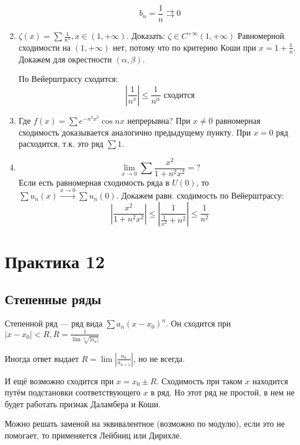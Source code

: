 \begin{exercise}
\begin{enumerate}
              \[b_n = \frac{1}{n} \rightrightarrows 0\]
        \item \(\zeta(x) = \sum \frac{1}{n^x}, x\in(1, +\infty)\). Доказать: \(\zeta \in C^{+\infty} (1, +\infty)\)
              Равномерной сходимости на \((1, +\infty)\) нет, потому что по критерию Коши при \(x = 1 + \frac{1}{n}\). Докажем для окрестности \((\alpha, \beta)\).

              По Вейерштрассу сходится:
              \[\left|\frac{1}{n^x}\right| \leq \frac{1}{n^\alpha} \text{ сходится}\]
        \item Где \(f(x) = \sum e^{ - n^2x^2} \cos nx\) непрерывна?
              При \(x \neq 0\) равномерная сходимость доказывается аналогично предыдущему пункту. При \(x = 0\) ряд расходится, т.к. это ряд \(\sum 1\).
        \item \[\lim_{x \to 0} \sum \frac{x^2}{1 + n^2x^2} = ?\]
              Если есть равномерная сходимость ряда в \(U(0)\), то \(\sum u_n(x) \xrightarrow{x\to 0} \sum u_n(0)\). Докажем равн. сходимость по Вейерштрассу:
              \[\left|\frac{x^2}{1 + n^2x^2}\right| \leq \left|\frac{1}{\frac{1}{x^2} + n^2}\right| \leq \frac{1}{n^2}\]
    \end{enumerate}
\end{exercise}

\section*{Практика 12}

\subsection*{Степенные ряды}

Степенной ряд --- ряд вида \(\sum a_n(x - x_0)^n\). Он сходится при \(\left|x - x_0\right|< R, R = \frac{1}{\overline \lim\sqrt[n]{|a_n|}}\)

Иногда ответ выдает \(R = \lim \left|\frac{a_n}{a_{n + 1}}\right|\), но не всегда.

И ещё возможно сходится при \(x = x_0 \pm R\). Сходимость при таком \(x\) находится путём подстановки соответствующего \(x\) в ряд. Но этот ряд не простой, в нем не будет работать признак Даламбера и Коши.

Можно решать заменой на эквивалентное (возможно по модулю), если это не помогает, то применяется Лейбниц или Дирихле.

